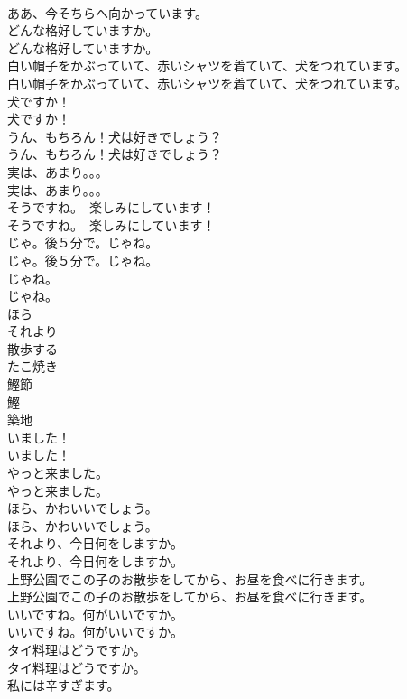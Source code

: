 \documentclass[8pt]{extreport}
\begin{document}
\begin{CJK}{UTF8}{min}
\\	ああ、今そちらへ向かっています。 
\\	どんな格好していますか。	
\\	どんな格好していますか。 
\\	白い帽子をかぶっていて、赤いシャツを着ていて、犬をつれています。	
\\	白い帽子をかぶっていて、赤いシャツを着ていて、犬をつれています。 
\\	犬ですか！	
\\	犬ですか！ 
\\	うん、もちろん！犬は好きでしょう？	
\\	うん、もちろん！犬は好きでしょう？ 
\\	実は、あまり。。。	
\\	実は、あまり。。。 
\\	そうですね。　楽しみにしています！	
\\	そうですね。　楽しみにしています！ 
\\	じゃ。後５分で。じゃね。	
\\	じゃ。後５分で。じゃね。 
\\	じゃね。	
\\	じゃね。 
\\	ほら
\\	それより
\\	散歩する
\\	たこ焼き
\\	鰹節
\\	鰹
\\	築地
\\	いました！	
\\	いました！ 
\\	やっと来ました。	
\\	やっと来ました。 
\\	ほら、かわいいでしょう。	
\\	ほら、かわいいでしょう。 
\\	それより、今日何をしますか。	
\\	それより、今日何をしますか。 
\\	上野公園でこの子のお散歩をしてから、お昼を食べに行きます。	
\\	上野公園でこの子のお散歩をしてから、お昼を食べに行きます。 
\\	いいですね。何がいいですか。	
\\	いいですね。何がいいですか。 
\\	タイ料理はどうですか。	
\\	タイ料理はどうですか。 
\\	私には辛すぎます。	

\end{CJK}
\end{document}
